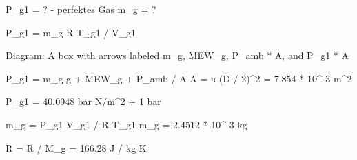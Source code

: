 P_g1 = ? - perfektes Gas  
m_g = ?  

P_g1 = m_g R T_g1 / V_g1  

Diagram: A box with arrows labeled m_g, MEW_g, P_amb * A, and P_g1 * A  

P_g1 = m_g g + MEW_g + P_amb / A  
A = π (D / 2)^2 = 7.854 * 10^-3 m^2  

P_g1 = 40.0948 bar N/m^2 + 1 bar  

m_g = P_g1 V_g1 / R T_g1  
m_g = 2.4512 * 10^-3 kg  

R = R / M_g = 166.28 J / kg K